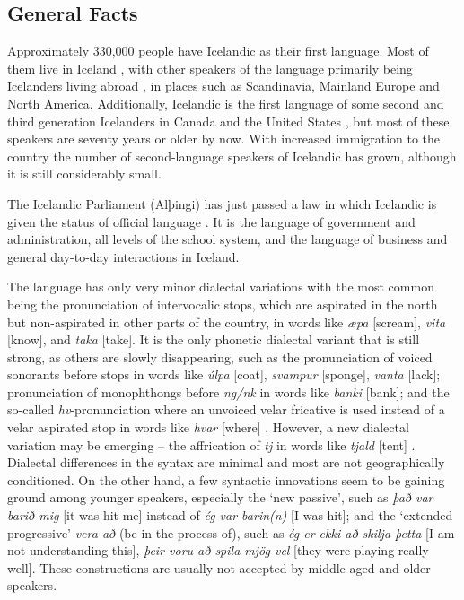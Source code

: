 \begin{multicols}{2}

\subsection{General Facts}

Approximately 330,000 people have Icelandic as their first language. Most of them live in Iceland \cite{hag1},  with other speakers of the language primarily being Icelanders living abroad \cite{vis1},  in places such as Scandinavia, Mainland Europe and North America. Additionally, Icelandic is the first language of some second and third generation Icelanders in Canada and the United States \cite{can1},  but most of these speakers are seventy years or older by now. With increased immigration to the country the number of second-language speakers of Icelandic has grown, although it is still considerably small. 


The Icelandic Parliament (Alþingi) has just passed a law in which Icelandic is given the status of official language \cite{alt1}.  It is the language of government and administration, all levels of the school system, and the language of business and general day-to-day interactions in Iceland.

The language has only very minor dialectal variations with the most common being the pronunciation of intervocalic stops, which are aspirated in the north but non-aspirated in other parts of the country, in words like \textit{æpa} {[}scream{]}, \textit{vita} {[}know{]}, and \textit{taka} {[}take{]}. It is the only phonetic dialectal variant that is still strong, as others are slowly disappearing, such as the pronunciation of voiced sonorants before stops in words like \textit{úlpa} {[}coat{]}, \textit{svamp\-ur} {[}sponge{]}, \textit{vanta} {[}lack{]}; pronunciation of monophthongs before \textit{ng/nk} in words like \textit{banki} {[}bank{]}; and the so-called \textit{hv}-pronunciation where an unvoiced velar fricative is used instead of a velar aspirated stop in words like \textit{hvar} {[}where{]} \cite{mal1}.  However, a new dialectal variation may be emerging -- the affrication of \textit{tj} in words like \textit{tjald} {[}tent{]} \cite{tvi1}. 
Dialectal differences in the syntax are minimal and most are not geographically conditioned. On the other hand, a few syntactic innovations seem to be gaining ground among younger speakers, especially the ‘new passive’, such as \textit{það var barið mig} {[}it was hit me{]} instead of \textit{ég var barin(n)} {[}I was hit{]}; and the ‘extended progressive’ \textit{vera að} (be in the process of), such as \textit{ég er ekki að skilja þetta} {[}I am not understanding this{]}, \textit{þeir voru að spila mjög vel} {[}they were playing really well{]}. These constructions are usually not accepted by middle-aged and older speakers.


\end{multicols}
